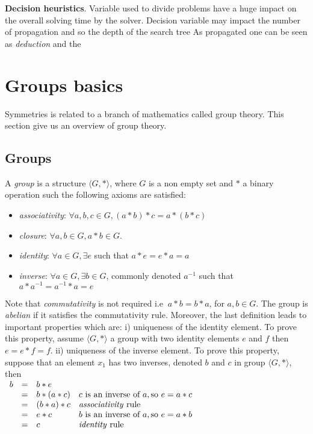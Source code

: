 \textbf{Decision heuristics}. Variable used to divide problems have a huge impact on the 
overall solving time by the solver. Decision variable may impact the number of propagation and so the depth of the search tree  As propagated one can be seen as \emph{deduction} and the 






\section{Groups basics}

Symmetries is related to a branch of mathematics called group theory. This section give us an overview of group
theory.

\subsection{Groups}

A \emph{group} is a structure $\langle G, * \rangle$, where $G$ is a non empty set and $*$ a binary
operation such the following axioms are satisfied:
\begin{itemize}[noitemsep,nolistsep]
	\item \emph{associativity}: $\forall a, b, c \in G, (a * b) * c = a * (b * c)$
	\item \emph{closure}: $\forall a, b \in G, a * b \in G$.
	\item \emph{identity}: $\forall a \in G, \exists e$ such that $ a * e = e * a = a$
	\item \emph{inverse}:  $\forall a \in G, \exists b \in G$, commonly denoted $a^{-1}$ such that
	 $a * a^{-1} = a^{-1} * a = e$
\end{itemize}

Note that \emph{commutativity} is not required i.e $\ a * b = b * a$, for $a, b \in G$.
The group is \emph{abelian} if it satisfies the commutativity rule.
Moreover, the last definition leads to important properties which are: i) uniqueness of the identity element. 
To prove this property, assume $\langle G, * \rangle$ a group with two identity elements $e$ and $f$ 
then $ e = e * f = f$.
ii) uniqueness of the inverse element. To prove this property, suppose that an element $x_1$ has two inverses,
denoted $b$ and $c$ in group $\langle G, * \rangle$, then\\
	$\begin{array}{lcll}					
			b & = & b * e & \\
			  & = & b * (a * c) & c \text{ is an inverse of } a, \text{so } e = a * c\\
			  & = & (b * a) * c &   \text{\emph{associativity} rule}\\
			  & = & e * c       & b \text{ is an inverse of } a, \text{so } e = a * b\\
			  & = & c           &   \text{\emph{identity} rule}
	\end{array}$


